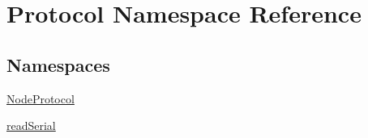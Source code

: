 \hypertarget{namespaceProtocol}{}\section{Protocol Namespace Reference}
\label{namespaceProtocol}
\subsection*{Namespaces}
\begin{DoxyCompactItemize}
\item 
 \hyperlink{namespaceProtocol_1_1NodeProtocol}{Node\+Protocol}
\item 
 \hyperlink{namespaceProtocol_1_1readSerial}{read\+Serial}
\end{DoxyCompactItemize}
